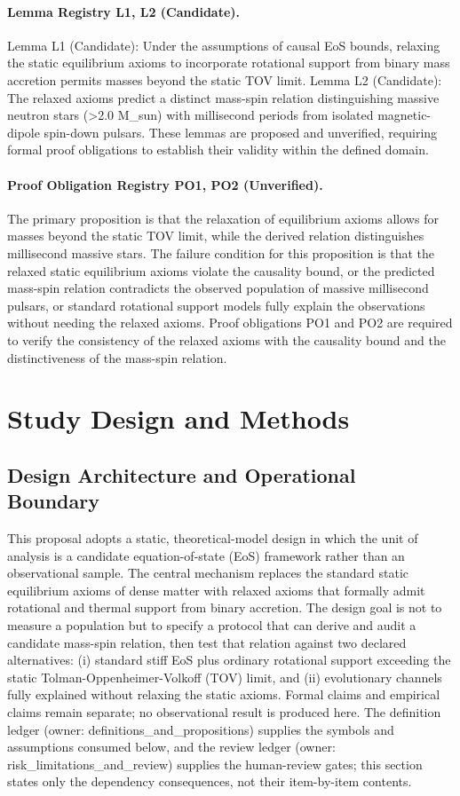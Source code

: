\documentclass[conference]{IEEEtran}
\begin{document}
\paragraph{Lemma Registry L1, L2 (Candidate).} Lemma L1 (Candidate): Under the assumptions of causal EoS bounds, relaxing the static equilibrium axioms to incorporate rotational support from binary mass accretion permits masses beyond the static TOV limit. Lemma L2 (Candidate): The relaxed axioms predict a distinct mass-spin relation distinguishing massive neutron stars (>2.0 M\_sun) with millisecond periods from isolated magnetic-dipole spin-down pulsars. These lemmas are proposed and unverified, requiring formal proof obligations to establish their validity within the defined domain.

\paragraph{Proof Obligation Registry PO1, PO2 (Unverified).} The primary proposition is that the relaxation of equilibrium axioms allows for masses beyond the static TOV limit, while the derived relation distinguishes millisecond massive stars. The failure condition for this proposition is that the relaxed static equilibrium axioms violate the causality bound, or the predicted mass-spin relation contradicts the observed population of massive millisecond pulsars, or standard rotational support models fully explain the observations without needing the relaxed axioms. Proof obligations PO1 and PO2 are required to verify the consistency of the relaxed axioms with the causality bound and the distinctiveness of the mass-spin relation.

\section{Study Design and Methods}
\subsection{Design Architecture and Operational Boundary}
This proposal adopts a static, theoretical-model design in which the unit of analysis is a candidate equation-of-state (EoS) framework rather than an observational sample. The central mechanism replaces the standard static equilibrium axioms of dense matter with relaxed axioms that formally admit rotational and thermal support from binary accretion. The design goal is not to measure a population but to specify a protocol that can derive and audit a candidate mass-spin relation, then test that relation against two declared alternatives: (i) standard stiff EoS plus ordinary rotational support exceeding the static Tolman-Oppenheimer-Volkoff (TOV) limit, and (ii) evolutionary channels fully explained without relaxing the static axioms. Formal claims and empirical claims remain separate; no observational result is produced here. The definition ledger (owner: definitions\_and\_propositions) supplies the symbols and assumptions consumed below, and the review ledger (owner: risk\_limitations\_and\_review) supplies the human-review gates; this section states only the dependency consequences, not their item-by-item contents.
\end{document}
